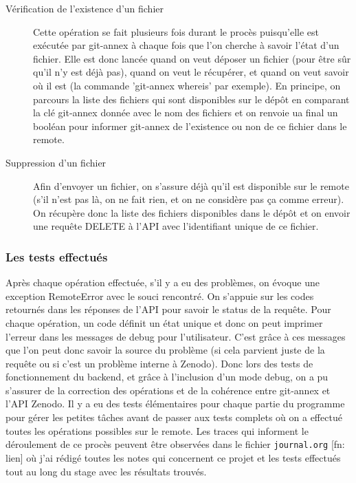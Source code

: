 \documentclass[11pt]{article}
\begin{document}
\begin{description}
\item[{Vérification de l'existence d'un fichier}] Cette opération se fait plusieurs fois durant le procès puisqu'elle
est exécutée par git-annex à chaque fois que l'on cherche à savoir
l'état d'un fichier. Elle est donc lancée quand on
veut déposer un fichier (pour être sûr qu'il n'y est déjà pas),
quand on veut le récupérer, et quand on veut savoir où il est (la
commande 'git-annex whereis' par exemple).
En principe, on parcours la liste des fichiers qui sont disponibles
sur le dépôt en comparant la clé git-annex donnée avec le nom des
fichiers et on renvoie ua final un booléan pour informer git-annex
de l'existence ou non de ce fichier dans le remote.

\item[{Suppression d'un fichier}] Afin d'envoyer un fichier, on s'assure déjà qu'il est disponible sur
le remote (s'il n'est pas là, on ne fait rien, et on ne considère
pas ça comme erreur). On récupère donc la liste des fichiers
disponibles dans le dépôt et on envoir une requête DELETE à l'API
avec l'identifiant unique de ce fichier.
\end{description}

\subsubsection{Les tests effectués}
\label{sec:orge78d522}
Après chaque opération effectuée, s'il y a eu des problèmes, on évoque
une exception RemoteError avec le souci rencontré. On s'appuie sur
les codes retournés dans les réponses de l'API pour savoir le status
de la requête. Pour chaque opération, un code définit un état unique
et donc on peut imprimer l'erreur dans les messages de debug pour
l'utilisateur. C'est grâce à ces messages que l'on peut donc savoir
la source du problème (si cela parvient juste de la requête ou si
c'est un problème interne à Zenodo). 
Donc lors des tests de fonctionnement du backend, et grâce à
l'inclusion d'un mode debug, on a pu s'assurer de la correction des
opérations et de la cohérence entre git-annex et l'API Zenodo.
Il y a eu des tests élémentaires pour chaque partie du programme
pour gérer les petites tâches avant de passer aux tests complets où
on a effectué toutes les opérations possibles sur le remote.
Les traces qui informent le déroulement de ce procès peuvent être
observées dans le fichier \texttt{journal.org}  [fn: lien] où j'ai rédigé toutes les
notes qui concernent ce projet et les tests effectués tout au long
du stage avec les résultats trouvés.
\end{document}
